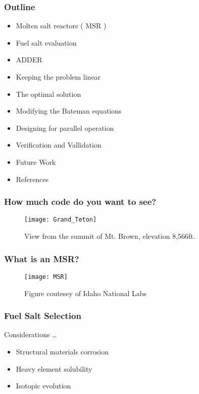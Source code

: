 \documentclass{beamer}
\title[Modelling of Material Transfers in Reactor Fuel Burnup Simulations]{}
\author{Daniel D. Wooten}
\institute{UC Berkeley}
\date{October 20\textsuperscript{th}, 2017}
\begin{document}
\frame{\titlepage}

\begin{frame}

\frametitle{Outline}

    \begin{itemize}
        \item Molten salt reactors ( MSR ) 
        \item Fuel salt evaluation 
        \item ADDER
        \item Keeping the problem linear
        \item The optimal solution
        \item Modifying the Bateman equations
        \item Designing for parallel operation
        \item Verification and Vallidation
        \item Future Work
        \item References
    \end{itemize}

\end{frame}

\begin{frame}
\frametitle{How much code do you want to see?}

    \begin{figure}
        \centering
        \texttt{[image: Grand\_Teton]}
        \caption{View from the summit of Mt. Brown, elevation 8,566ft.}
        \label{fig:msr_pic}
    \end{figure}

\end{frame}

\begin{frame}
\frametitle{What is an MSR?}

    \begin{figure}
        \centering
        \texttt{[image: MSR]}
        \caption{Figure coutesey of Idaho National Labs}
        \label{fig:msr_pic}
    \end{figure}

\end{frame}

\begin{frame}
\frametitle{Fuel Salt Selection}

Considerations \ldots

    \begin{itemize}
        \item Structural materials corrosion 
        \item Heavy element solubility
        \item Isotopic evolution
    \end{itemize}

\end{frame}
\end{document}

